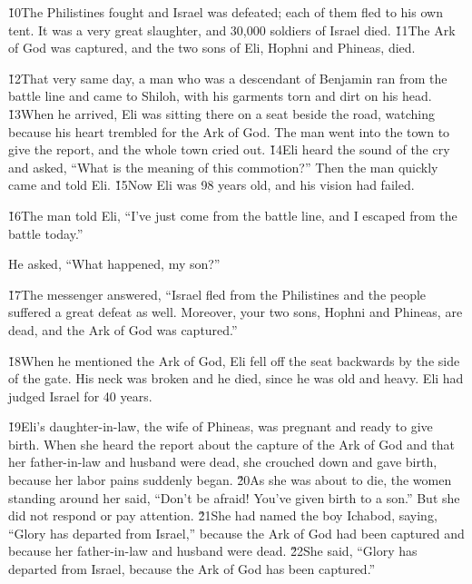 \v{10}The Philistines fought and Israel was defeated; each of them fled to his own tent. It was a very great slaughter, and 30,000 soldiers of Israel died. \v{11}The Ark of God was captured, and the two sons of Eli, Hophni and Phineas, died.

\v{12}That very same day, a man who was a descendant of Benjamin ran from the battle line and came to Shiloh, with his garments torn and dirt on his head. \v{13}When he arrived, Eli was sitting there on a seat beside the road, watching because his heart trembled for the Ark of God. The man went into the town to give the report, and the whole town cried out. \v{14}Eli heard the sound of the cry and asked, ``What is the meaning of this commotion?'' Then the man quickly came and told Eli. \v{15}Now Eli was 98 years old, and his vision had failed.

\v{16}The man told Eli, ``I've just come from the battle line, and I escaped from the battle today.''

He asked, ``What happened, my son?''

\v{17}The messenger answered, ``Israel fled from the Philistines and the people suffered a great defeat as well. Moreover, your two sons, Hophni and Phineas, are dead, and the Ark of God was captured.''

\v{18}When he mentioned the Ark of God, Eli fell off the seat backwards by the side of the gate. His neck was broken and he died, since he was old and heavy. Eli had judged Israel for 40 years.

\v{19}Eli's daughter-in-law, the wife of Phineas, was pregnant and ready to give birth. When she heard the report about the capture of the Ark of God and that her father-in-law and husband were dead, she crouched down and gave birth, because her labor pains suddenly began. \v{20}As she was about to die, the women standing around her said, ``Don't be afraid! You've given birth to a son.'' But she did not respond or pay attention. \v{21}She had named the boy Ichabod, saying, ``Glory has departed from Israel,'' because the Ark of God had been captured and because her father-in-law and husband were dead. \v{22}She said, ``Glory has departed from Israel, because the Ark of God has been captured.''

